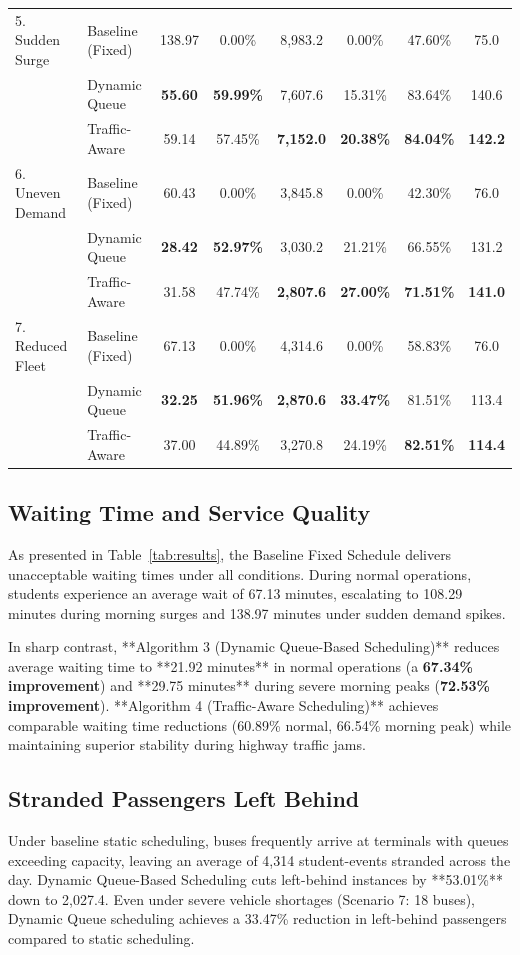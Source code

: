 \documentclass[conference]{IEEEtran}
\begin{document}
\begin{table}[t]
\begin{tabular}{llcccccc}
\midrule
5. Sudden Surge  & Baseline (Fixed) & 138.97 & 0.00\% & 8,983.2 & 0.00\% & 47.60\% & 75.0 \\
                 & Dynamic Queue    & \textbf{55.60} & \textbf{59.99\%} & 7,607.6 & 15.31\% & 83.64\% & 140.6 \\
                 & Traffic-Aware    & 59.14 & 57.45\% & \textbf{7,152.0} & \textbf{20.38\%} & \textbf{84.04\%} & \textbf{142.2} \\
\midrule
6. Uneven Demand & Baseline (Fixed) & 60.43 & 0.00\% & 3,845.8 & 0.00\% & 42.30\% & 76.0 \\
                 & Dynamic Queue    & \textbf{28.42} & \textbf{52.97\%} & 3,030.2 & 21.21\% & 66.55\% & 131.2 \\
                 & Traffic-Aware    & 31.58 & 47.74\% & \textbf{2,807.6} & \textbf{27.00\%} & \textbf{71.51\%} & \textbf{141.0} \\
\midrule
7. Reduced Fleet & Baseline (Fixed) & 67.13 & 0.00\% & 4,314.6 & 0.00\% & 58.83\% & 76.0 \\
                 & Dynamic Queue    & \textbf{32.25} & \textbf{51.96\%} & \textbf{2,870.6} & \textbf{33.47\%} & 81.51\% & 113.4 \\
                 & Traffic-Aware    & 37.00 & 44.89\% & 3,270.8 & 24.19\% & \textbf{82.51\%} & \textbf{114.4} \\
\bottomrule
\end{tabular}
\end{table}

\subsection{Waiting Time and Service Quality}
As presented in Table~\ref{tab:results}, the Baseline Fixed Schedule delivers unacceptable waiting times under all conditions. During normal operations, students experience an average wait of 67.13 minutes, escalating to 108.29 minutes during morning surges and 138.97 minutes under sudden demand spikes. 

In sharp contrast, **Algorithm 3 (Dynamic Queue-Based Scheduling)** reduces average waiting time to **21.92 minutes** in normal operations (a \textbf{67.34\% improvement}) and **29.75 minutes** during severe morning peaks (\textbf{72.53\% improvement}). **Algorithm 4 (Traffic-Aware Scheduling)** achieves comparable waiting time reductions (60.89\% normal, 66.54\% morning peak) while maintaining superior stability during highway traffic jams.

\subsection{Stranded Passengers Left Behind}
Under baseline static scheduling, buses frequently arrive at terminals with queues exceeding capacity, leaving an average of 4,314 student-events stranded across the day. Dynamic Queue-Based Scheduling cuts left-behind instances by **53.01\%** down to 2,027.4. Even under severe vehicle shortages (Scenario 7: 18 buses), Dynamic Queue scheduling achieves a 33.47\% reduction in left-behind passengers compared to static scheduling.
\end{document}
